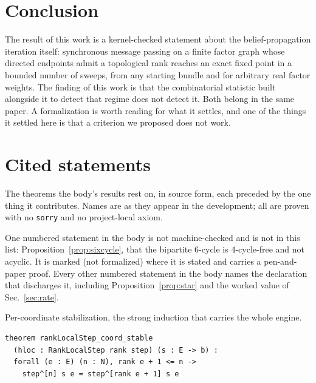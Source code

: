 \documentclass[aps,prx,reprint,nofootinbib,floatfix]{revtex4-2}
\begin{document}

\section{Conclusion}
\label{sec:conclusion}

The result of this work is a kernel-checked statement about the
belief-propagation iteration itself: synchronous message passing on a finite
factor graph whose directed endpoints admit a topological rank reaches an exact
fixed point in a bounded number of sweeps, from any starting bundle and for
arbitrary real factor weights. The finding of this work is that the
combinatorial statistic built alongside it to detect that regime does not
detect it. Both belong in the same paper. A formalization is worth reading
for what it settles, and one of the things it settled here is that a criterion
we proposed does not work.

\appendix

\section{Cited statements}
\label{app:statements}

The theorems the body's results rest on, in source form, each preceded by the
one thing it contributes. Names are as they appear in the development; all are
proven with no \texttt{sorry} and no project-local axiom.

One numbered statement in the body is not machine-checked and is not in this
list: Proposition~\ref{prop:sixcycle}, that the bipartite 6-cycle is
4-cycle-free and not acyclic. It is marked \textup{(not formalized)} where it is
stated and carries a pen-and-paper proof. Every other numbered statement in the body
names the declaration that discharges it, including
Proposition~\ref{prop:star} and the worked value of Sec.~\ref{sec:rate}.

Per-coordinate stabilization, the strong induction that carries the whole engine.

{\footnotesize
\begin{lstlisting}[basicstyle=\ttfamily,columns=fullflexible,keepspaces=true,showstringspaces=false,breaklines=true,breakatwhitespace=true,breakindent=1em]
theorem rankLocalStep_coord_stable
  (hloc : RankLocalStep rank step) (s : E -> b) :
  forall (e : E) (n : N), rank e + 1 <= n ->
    step^[n] s e = step^[rank e + 1] s e
\end{lstlisting}
}
\end{document}
